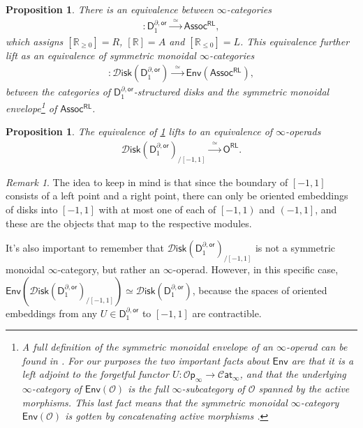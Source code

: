 \documentclass[12pt,a4paper]{article}
\newcounter{counter} \numberwithin{counter}{section}
\theoremstyle{definition}
\theoremstyle{plain}
\newtheorem{proposition}[counter]{Proposition}
\theoremstyle{remark}
\newtheorem{remark}[counter]{Remark}
\newcommand{\disk}{\mathscr{D} \mathsf{isk}}
\newcommand{\cat}{\mathscr{C} \mathsf{at}_{\infty}}
\newcommand{\hoint}{\mathbb{R}_{\geq 0}}
\begin{document}
\begin{proposition}\label{prop:disk1bor=assocRL}
    There is an equivalence between $\infty$-categories
    \begin{align}
        [-]: \mathsf{D}_1^{\partial, \mathsf{or}} \xrightarrow{\ \ \simeq \ \ } \mathsf{Assoc^{RL}},
    \end{align}
    which assigns $[\hoint] = R$, $[\mathbb{R}] = A$ and $[\mathbb{R}_{\leq 0}] = L$. This equivalence further lift as an equivalence of symmetric monoidal $\infty$-categories
    \begin{align}
        [-]: \disk (\mathsf{D}_1^{\partial, \mathsf{or}}) \xrightarrow{\ \ \simeq \ \ } \mathsf{Env} (\mathsf{Assoc^{RL}}),
    \end{align}
    between the categories of $\mathsf{D}_1^{\partial, \mathsf{or}}$-structured disks and the symmetric monoidal envelope\footnote{A full definition of the symmetric monoidal envelope of an $\infty$-operad can be found in \cite[sec.2.2.4]{lurie_ha}. For our purposes the two important facts about $\mathsf{Env}$ are that it is a left adjoint to the forgetful functor $U: \mathscr{O}\mathsf{p}_{\infty} \rightarrow \cat$, and that the underlying $\infty$-category of $\mathsf{Env} (\mathscr{O})$ is the full $\infty$-subcategory of $\mathscr{O}$ spanned by the active morphisms. This last fact means that the symmetric monoidal $\infty$-category $\mathsf{Env}(\mathscr{O})$ is gotten by concatenating active morphisms \cite[rem.2.2.4.6]{lurie_ha}.} of $\mathsf{Assoc^{RL}}$.
\end{proposition}

\begin{proposition}\label{prop:disk1bor_over_int=ORL}
    The equivalence of \cref{prop:disk1bor=assocRL} lifts to an equivalence of $\infty$-operads
    \begin{align}
        \disk (\mathsf{D}_1^{\partial, \mathsf{or}})_{/[-1,1]} \xrightarrow{\ \ \simeq \ \ } \mathsf{O^{RL}}.
    \end{align}
\end{proposition}

\begin{remark}
    The idea to keep in mind is that since the boundary of $[-1,1]$ consists of a left point and a right point, there can only be oriented embeddings of disks into $[-1,1]$ with at most one of each of $\left[-1,1 \right)$ and $\left( -1, 1 \right]$, and these are the objects that map to the respective modules.

    It's also important to remember that $\disk (\mathsf{D}_1^{\partial, \mathsf{or}})_{/[-1,1]}$ is not a symmetric monoidal $\infty$-category, but rather an $\infty$-operad. However, in this specific case, $\mathsf{Env}(\disk (\mathsf{D}_1^{\partial, \mathsf{or}})_{/[-1,1]}) \simeq \disk (\mathsf{D}_1^{\partial, \mathsf{or}})$, because the spaces of oriented embeddings from any $U \in \mathsf{D}_1^{\partial, \mathsf{or}}$ to $[-1,1]$ are contractible.
\end{remark}
\end{document}
